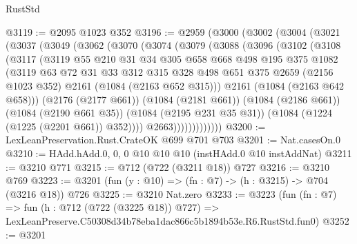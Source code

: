 \begin{lexlean}{RustStd}
\begin{coremodule}
@3119 := @2095 @1023 @352
@3196 := @2959
    (@3000
      (@3002
        (@3004
          (@3021
            (@3037
              (@3049
                (@3062
                  (@3070
                    (@3074
                      (@3079
                        (@3088
                          (@3096
                            (@3102
                              (@3108
                                (@3117
                                  (@3119
                                    @55
                                    @210
                                    @31
                                    @34
                                    @305
                                    @658
                                    @668
                                    @498
                                    @195
                                    @375
                                    @1082
                                    (@3119
                                      @63
                                      @72
                                      @31
                                      @33
                                      @312
                                      @315
                                      @328
                                      @498
                                      @651
                                      @375
                                      @2659
                                      (@2156 @1023 @352)
                                      @2161
                                      (@1084 (@2163 @652 @315)))
                                    @2161
                                    (@1084 (@2163 @642 @658)))
                                  (@2176 (@2177 @661))
                                  (@1084 (@2181 @661))
                                  (@1084 (@2186 @661))
                                  (@1084 (@2190 @661 @35))
                                  (@1084 (@2195 @231 @35 @31))
                                  (@1084 (@1224 (@1225 (@2201 @661)) @352))))
                              @2663)))))))))))))
@3200 := LexLeanPreservation.Rust.CrateOK @699 @701 @703
@3201 := Nat.casesOn.{0}
@3210 := HAdd.hAdd.{0, 0, 0} @10 @10 @10 (instHAdd.{0} @10 instAddNat)
@3211 := @3210 @771
@3215 := @712 (@722 (@3211 @18)) @727
@3216 := @3210 @769
@3223 := @3201 (fun (y : @10) => (fn : @7) -> (h : @3215) -> @704 (@3216 @18)) @726
@3225 := @3210 Nat.zero
@3233 := @3223
    (fun (fn : @7) =>
    fun (h : @712 (@722 (@3225 @18)) @727) =>
    LexLeanPreserve.C50308d34b78eba1dac866c5b1894b53e.R6.RustStd.fun0)
@3252 := @3201

\end{coremodule}
\end{lexlean}
